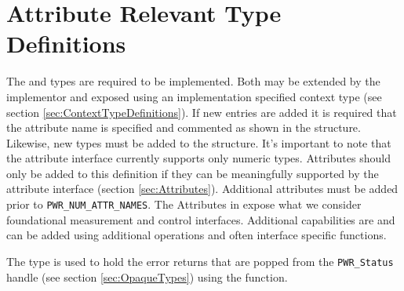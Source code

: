 \section{Attribute Relevant Type Definitions}\label{sec:AttributeTypeDefinitions}

The  and  types are required to be implemented. 
Both may be extended by the implementor and exposed using an implementation specified context type (see section \ref{sec:ContextTypeDefinitions}).
If new  entries are added it is required that the attribute name is specified and commented as shown in the  structure.
Likewise, new types must be added to the  structure. 
It's important to note that the attribute interface currently supports only numeric types.
Attributes should only be added to this definition if they can be meaningfully supported by the attribute interface (section \ref{sec:Attributes}).
Additional attributes must be added prior to  \texttt{PWR_NUM_ATTR_NAMES}.
The Attributes in  expose what we consider foundational measurement and control interfaces. 
Additional capabilities are and can be added using additional operations and often interface specific functions.

The  type is used to hold the error returns that are popped from the \texttt{PWR_Status} handle (see section \ref{sec:OpaqueTypes}) using the  function.


